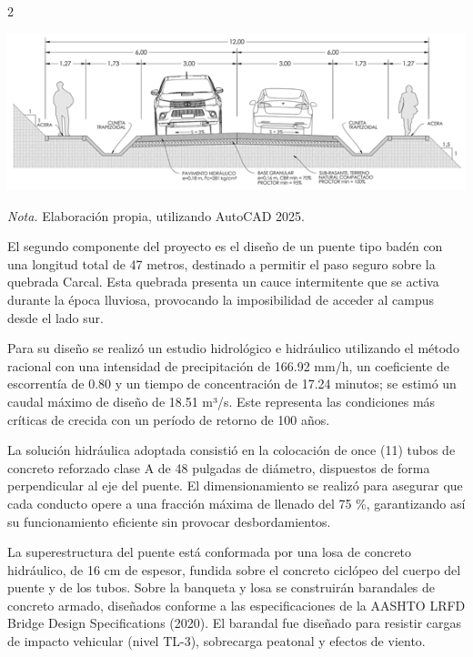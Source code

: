 \documentclass[12pt,spanish,Letterpaper,openany]{book}
\begin{document}
\begin {multicols}{2}
\begin {flushleft}
\noindent\begin{minipage}[c]{\columnwidth}

\textbf{}

\begin{center}\includegraphics[width=0.95\linewidth]{imagenes_articulos/art03_04} \end{center}

\emph{Nota.} Elaboración propia, utilizando AutoCAD 2025.

\end{minipage}
\end {flushleft}

El segundo componente del proyecto es el diseño de un puente tipo badén con una longitud total de 47 metros, destinado a permitir el paso seguro sobre la quebrada Carcal. Esta quebrada presenta un cauce intermitente que se activa durante la época lluviosa, provocando la imposibilidad de acceder al campus desde el lado sur.

Para su diseño se realizó un estudio hidrológico e hidráulico utilizando el método racional con una intensidad de precipitación de 166.92 mm/h, un coeficiente de escorrentía de 0.80 y un tiempo de concentración de 17.24 minutos; se estimó un caudal máximo de diseño de 18.51 m³/s. Este representa las condiciones más críticas de crecida con un período de retorno de 100 años.

La solución hidráulica adoptada consistió en la colocación de once (11) tubos de concreto reforzado clase A de 48 pulgadas de diámetro, dispuestos de forma perpendicular al eje del puente. El dimensionamiento se realizó para asegurar que cada conducto opere a una fracción máxima de llenado del 75 \%, garantizando así su funcionamiento eficiente sin provocar desbordamientos.

La superestructura del puente está conformada por una losa de concreto hidráulico, de 16 cm de espesor, fundida sobre el concreto ciclópeo del cuerpo del puente y de los tubos. Sobre la banqueta y losa se construirán barandales de concreto armado, diseñados conforme a las especificaciones de la AASHTO LRFD Bridge Design Specifications (2020). El barandal fue diseñado para resistir cargas de impacto vehicular (nivel TL-3), sobrecarga peatonal y efectos de viento.


\end{multicols}
\end{document}
